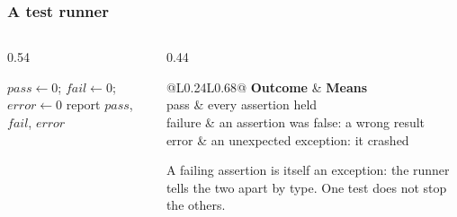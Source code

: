\documentclass[aspectratio=169,10pt,compress]{beamer}
\begin{document}
\begin{frame}[t,fragile] \frametitle{A test runner}
	\begin{columns}[T]
		\begin{column}{0.54\textwidth}


\begin{algorithm}[H]
				\caption{RunAll($tests$)}
				$pass \gets 0$; $fail \gets 0$; $error \gets 0$\;
				report $pass$, $fail$, $error$\;
\end{algorithm}

		\end{column}
		\begin{column}{0.44\textwidth}


\begin{table}
				\footnotesize
				\begin{tabular}{@{}L{0.24\textwidth}L{0.68\textwidth}@{}}
					\toprule
					\textbf{Outcome} & \textbf{Means} \\
					\midrule
					pass    & every assertion held \\
					failure & an assertion was false: a wrong result \\
					error   & an unexpected exception: it crashed \\
					\bottomrule
				\end{tabular}
\end{table}%


			\small A failing assertion is itself an exception: the runner tells the two apart by type.
			One test does not stop the others.
		\end{column}
	\end{columns}
\end{frame}
\end{document}
